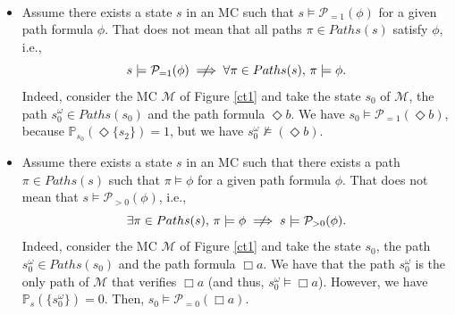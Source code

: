 \begin{remark} $ $\\[-1.5em]
\begin{itemize}
  \item Assume there exists a state $s$ in an MC such that $s \models \mathcal{P}_{=1}(\phi)$ for a given path formula $\phi$. That does not mean that all paths $\pi \in Paths(s)$ satisfy $\phi$, i.e.,
  \[s \models \mathcal{P}_{=1}(\phi) \centernot\implies \forall \pi \in Paths(s), \, \pi \models \phi.\]
  Indeed, consider the MC $\mathcal{M}$ of Figure \ref{ct1} and take the state $s_0$ of $\mathcal{M}$, the path $s_0^\omega \in Paths(s_0)$ and the path formula $\Diamond b$. We have $s_0 \models \mathcal{P}_{=1}(\Diamond b)$, because $\mathbb{P}_{s_0}(\Diamond \{s_2\})=1$, but we have $s_0^\omega \not \models (\Diamond b)$.

  \item Assume there exists a state $s$ in an MC such that there exists a path $\pi \in Paths(s)$ such that $\pi \models \phi$ for a given path formula $\phi$.
  That does not mean that $s \models \mathcal{P}_{> 0}(\phi)$, i.e.,
  \[
    \exists \pi \in Paths(s),\, \pi \models \phi \centernot\implies s \models \mathcal{P}_{>0} (\phi).
  \]
  Indeed, consider the MC $\mathcal{M}$ of Figure \ref{ct1} and take the state $s_0$, the path $s_0^\omega \in Paths(s_0)$ and the path formula $\Box a$. We have that the path $s_0^\omega$ is the only path of $\mathcal{M}$ that verifies $\Box a$ (and thus, $s_0^\omega \models \Box a$).
  However, we have $\mathbb{P}_s(\{s_0^\omega\})=0$. Then, $s_0 \models \mathcal{P}_{=0} (\Box a)$.
\end{itemize}
\end{remark}

